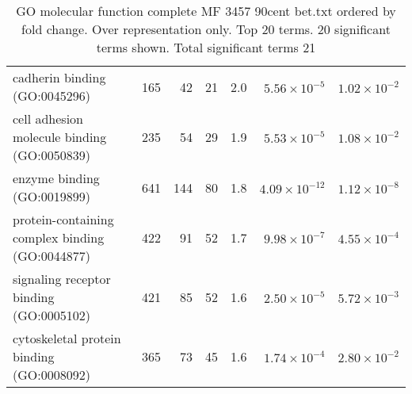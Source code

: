 \begin{table}[ht]
\begin{adjustbox}{width=\textwidth}
\begin{tabular}{lrrrrrr}
  cadherin binding (GO:0045296) & 165 & 42 & 21 & 2.0 & $5.56 \times 10^{-5}$ & $1.02 \times 10^{-2}$ \\ 
  cell adhesion molecule binding (GO:0050839) & 235 & 54 & 29 & 1.9 & $5.53 \times 10^{-5}$ & $1.08 \times 10^{-2}$ \\ 
  enzyme binding (GO:0019899) & 641 & 144 & 80 & 1.8 & $4.09 \times 10^{-12}$ & $1.12 \times 10^{-8}$ \\ 
  protein-containing complex binding (GO:0044877) & 422 & 91 & 52 & 1.7 & $9.98 \times 10^{-7}$ & $4.55 \times 10^{-4}$ \\ 
  signaling receptor binding (GO:0005102) & 421 & 85 & 52 & 1.6 & $2.50 \times 10^{-5}$ & $5.72 \times 10^{-3}$ \\ 
  cytoskeletal protein binding (GO:0008092) & 365 & 73 & 45 & 1.6 & $1.74 \times 10^{-4}$ & $2.80 \times 10^{-2}$ \\ 
   \hline
\end{tabular}
\end{adjustbox}
\caption{GO molecular function complete MF 3457 90cent bet.txt ordered by fold change. Over representation only. Top 20 terms. 20 significant terms shown. Total significant terms 21} 
\label{tab:GO molecular function complete MF 3457 90cent bet.txt ordered by fold change. Over representation only. Top 20 terms. 20 significant terms shown. Total significant terms 21}
\end{table}



